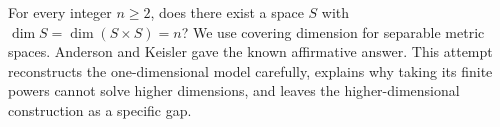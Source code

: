 For every integer \(n\geq2\), does there exist a space \(S\) with
\(\dim S=\dim(S\times S)=n\)?
We use covering dimension for separable metric spaces. Anderson and Keisler gave the known affirmative answer. This attempt reconstructs the one-dimensional model carefully, explains why taking its finite powers cannot solve higher dimensions, and leaves the higher-dimensional construction as a specific gap.
